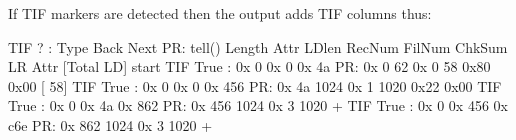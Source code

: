 \documentclass[letterpaper,10pt,english]{sphinxmanual}
\begin{document}
If TIF markers are detected then the output adds TIF columns thus:

\begin{sphinxVerbatim}[commandchars=\\\{\}]
TIF     ?  :        Type        Back        Next  PR:     tell()  Length    Attr  LD\PYGZus{}len  RecNum  FilNum  ChkSum   LR Attr [Total LD]
\PYGZhy{}\PYGZhy{}\PYGZhy{}\PYGZhy{}\PYGZhy{}\PYGZhy{}\PYGZhy{}\PYGZhy{}\PYGZhy{}\PYGZhy{}\PYGZhy{}\PYGZhy{}\PYGZhy{}\PYGZhy{}\PYGZhy{}\PYGZhy{}\PYGZhy{}\PYGZhy{}\PYGZhy{}\PYGZhy{}\PYGZhy{}\PYGZhy{}\PYGZhy{}\PYGZhy{}\PYGZhy{}\PYGZhy{}\PYGZhy{}\PYGZhy{}\PYGZhy{}\PYGZhy{}\PYGZhy{}\PYGZhy{}\PYGZhy{}\PYGZhy{}\PYGZhy{}\PYGZhy{}\PYGZhy{}\PYGZhy{}\PYGZhy{}\PYGZhy{}\PYGZhy{}\PYGZhy{}\PYGZhy{}\PYGZhy{}\PYGZhy{}\PYGZhy{}\PYGZhy{}\PYGZhy{}\PYGZhy{}\PYGZhy{}\PYGZhy{}\PYGZhy{}\PYGZhy{}\PYGZhy{}\PYGZhy{}\PYGZhy{}\PYGZhy{}\PYGZhy{}\PYGZhy{}\PYGZhy{}\PYGZhy{}\PYGZhy{}\PYGZhy{} start \PYGZhy{}\PYGZhy{}\PYGZhy{}\PYGZhy{}\PYGZhy{}\PYGZhy{}\PYGZhy{}\PYGZhy{}\PYGZhy{}\PYGZhy{}\PYGZhy{}\PYGZhy{}\PYGZhy{}\PYGZhy{}\PYGZhy{}\PYGZhy{}\PYGZhy{}\PYGZhy{}\PYGZhy{}\PYGZhy{}\PYGZhy{}\PYGZhy{}\PYGZhy{}\PYGZhy{}\PYGZhy{}\PYGZhy{}\PYGZhy{}\PYGZhy{}\PYGZhy{}\PYGZhy{}\PYGZhy{}\PYGZhy{}\PYGZhy{}\PYGZhy{}\PYGZhy{}\PYGZhy{}\PYGZhy{}\PYGZhy{}\PYGZhy{}\PYGZhy{}\PYGZhy{}\PYGZhy{}\PYGZhy{}\PYGZhy{}\PYGZhy{}\PYGZhy{}\PYGZhy{}\PYGZhy{}\PYGZhy{}\PYGZhy{}\PYGZhy{}\PYGZhy{}\PYGZhy{}\PYGZhy{}\PYGZhy{}\PYGZhy{}\PYGZhy{}\PYGZhy{}\PYGZhy{}\PYGZhy{}\PYGZhy{}\PYGZhy{}\PYGZhy{}
TIF  True \PYGZgt{}:  0x       0  0x       0  0x      4a  PR: 0x       0      62  0x   0      58  \PYGZhy{}\PYGZhy{}\PYGZhy{}\PYGZhy{}\PYGZhy{}\PYGZhy{}  \PYGZhy{}\PYGZhy{}\PYGZhy{}\PYGZhy{}\PYGZhy{}\PYGZhy{}  \PYGZhy{}\PYGZhy{}\PYGZhy{}\PYGZhy{}\PYGZhy{}\PYGZhy{} 0x80 0x00 [      58]
TIF  True \PYGZgt{}:  0x       0  0x       0  0x     456  PR: 0x      4a    1024  0x   1    1020  \PYGZhy{}\PYGZhy{}\PYGZhy{}\PYGZhy{}\PYGZhy{}\PYGZhy{}  \PYGZhy{}\PYGZhy{}\PYGZhy{}\PYGZhy{}\PYGZhy{}\PYGZhy{}  \PYGZhy{}\PYGZhy{}\PYGZhy{}\PYGZhy{}\PYGZhy{}\PYGZhy{} 0x22 0x00
TIF  True \PYGZgt{}:  0x       0  0x      4a  0x     862  PR: 0x     456    1024  0x   3    1020  \PYGZhy{}\PYGZhy{}\PYGZhy{}\PYGZhy{}\PYGZhy{}\PYGZhy{}  \PYGZhy{}\PYGZhy{}\PYGZhy{}\PYGZhy{}\PYGZhy{}\PYGZhy{}  \PYGZhy{}\PYGZhy{}\PYGZhy{}\PYGZhy{}\PYGZhy{}\PYGZhy{} + \PYGZhy{}\PYGZhy{}   \PYGZhy{}\PYGZhy{}
TIF  True \PYGZgt{}:  0x       0  0x     456  0x     c6e  PR: 0x     862    1024  0x   3    1020  \PYGZhy{}\PYGZhy{}\PYGZhy{}\PYGZhy{}\PYGZhy{}\PYGZhy{}  \PYGZhy{}\PYGZhy{}\PYGZhy{}\PYGZhy{}\PYGZhy{}\PYGZhy{}  \PYGZhy{}\PYGZhy{}\PYGZhy{}\PYGZhy{}\PYGZhy{}\PYGZhy{} + \PYGZhy{}\PYGZhy{}   \PYGZhy{}\PYGZhy{}

\end{sphinxVerbatim}
\end{document}
